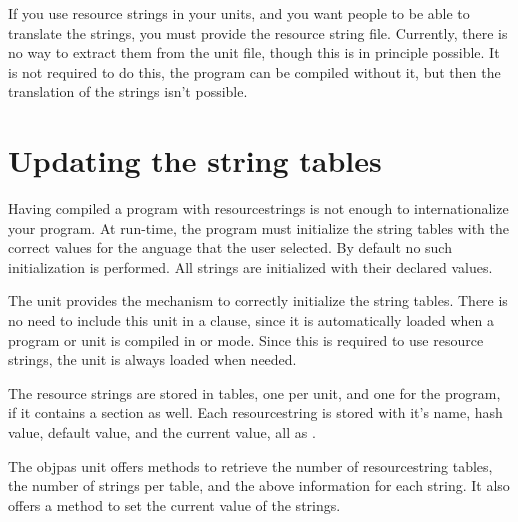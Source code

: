If you use resource strings in your units, and you want people to be able to
translate the strings, you must provide the resource string file. Currently,
there is no way to extract them from the unit file, though this is in
principle possible. It is not required to do this, the program can be
compiled without it, but then the translation of the strings isn't possible.

\section{Updating the string tables}
Having compiled a program with resourcestrings is not enough to
internationalize your program. At run-time, the program must initialize
the string tables with the correct values for the anguage that the user
selected. By default no such initialization is performed. All strings
are initialized with their declared values.

The  unit provides the mechanism to correctly initialize
the string tables. There is no need to include this unit in a 
clause, since it is automatically loaded when a program or unit is
compiled in  or  mode. Since this is required
to use resource strings, the unit is always loaded when needed.

The resource strings are stored in tables, one per unit, and one for the
program, if it contains a  section as well. Each
resourcestring is stored with it's name, hash value, default value, and
the current value, all as .

The objpas unit offers methods to retrieve the number of resourcestring
tables, the number of strings per table, and the above information for each
string. It also offers a method to set the current value of the strings.

